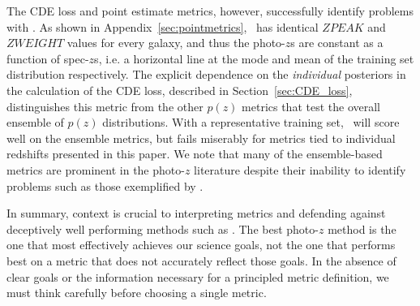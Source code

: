 The CDE loss and point estimate metrics, however, successfully identify problems with \trainz.
As shown in Appendix~\ref{sec:pointmetrics}, \trainz ~has identical $ZPEAK$ and $ZWEIGHT$ values for every galaxy, and thus the photo-$z$s are constant as a function of spec-$z$s, i.e. a horizontal line at the mode and mean of the training set distribution respectively.  The explicit dependence on the {\it individual} posteriors in the calculation of the CDE loss, described in Section~\ref{sec:CDE_loss}, distinguishes this metric from the other $p(z)$ metrics that test the overall ensemble of $p(z)$ distributions.  With a representative training set, \trainz\ will score well on the ensemble metrics, but fails miserably for metrics tied to individual redshifts presented in this paper.  We note that many of the ensemble-based metrics are prominent in the photo-$z$ literature despite their inability to identify problems such as those exemplified by \trainz. 


In summary, context is crucial to interpreting metrics and defending against deceptively well performing methods such as \trainz.
The best photo-$z$ method is the one that most effectively achieves our science goals, not the one that performs best on a metric that does not accurately reflect those goals.
In the absence of clear goals or the information necessary for a principled metric definition, we must think carefully before choosing a single metric.

